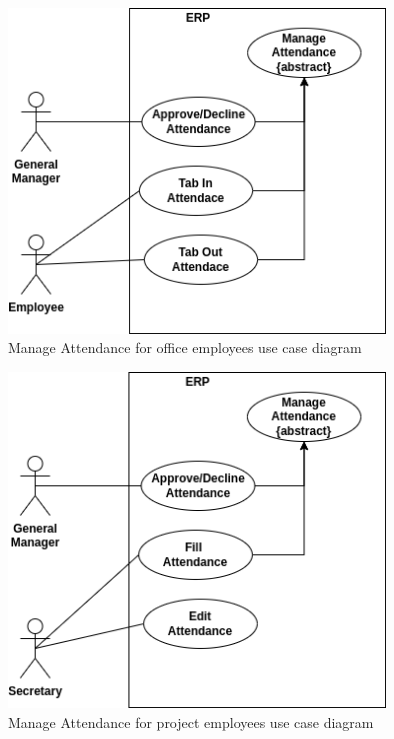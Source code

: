 \begin{figure}[!ht]
\centering
\includegraphics[width=10cm,keepaspectratio]{usecases/attendance.drawio.png}
\caption{Manage Attendance for office employees use case diagram }
\end{figure}

\begin{figure}[!ht]
\centering
\includegraphics[width=10cm,keepaspectratio]{usecases/attendance_project.drawio.png}
\caption{Manage Attendance for project employees use case diagram }
\end{figure}


